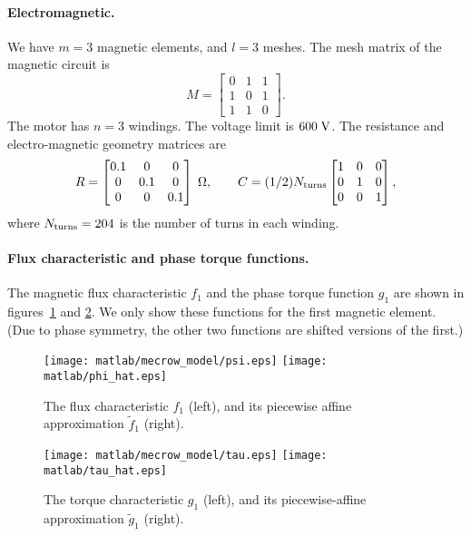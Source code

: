 \documentclass[11pt]{article}
\newif\ifarxiv
\begin{document}
\paragraph{Electromagnetic.}
We have $m = 3$ magnetic elements, and $l = 3$ meshes.
The mesh matrix of the magnetic circuit is
\[
M = 
\begin{bmatrix}
   0 &  1 &  1 \\
   1 &  0 &  1 \\
   1 &  1 &  0
\end{bmatrix}.
\]
The motor has $n = 3$ windings.
The voltage limit is $600 \; \rm V$.
The resistance and electro-magnetic geometry matrices are
\[
R = 
\begin{bmatrix}
  0.1 &   0 &   0 \\
    0 & 0.1 &   0 \\
    0 &   0 & 0.1
\end{bmatrix} \; \Omega,
\qquad
C = (1/2)N_{\rm turns}
\begin{bmatrix}
  1 & 0 & 0 \\
  0 & 1 & 0 \\
  0 & 0 & 1
\end{bmatrix},
\]
where $N_{\rm turns} = 204$ is the number of turns in each winding.






\paragraph{Flux characteristic and phase torque functions.}
The magnetic flux characteristic $f_1$ and the phase torque function $g_1$ 
are shown in figures~\ref{f-flux-characteristic}
and \ref{f-torque-function}.
We only show these functions for the first magnetic element.
(Due to phase symmetry,
the other two functions are shifted versions of the first.)

\begin{figure} 
\begin{center}
\ifarxiv
\texttt{[image: psi.eps]}
\texttt{[image: phi\_hat.eps]}
\else
\texttt{[image: matlab/mecrow\_model/psi.eps]}
\texttt{[image: matlab/phi\_hat.eps]}
\fi
\caption{
The flux characteristic $f_1$ (left),
and its piecewise affine approximation $\tilde f_1$ (right).
}
\label{f-flux-characteristic}
\end{center}
\end{figure}

\begin{figure} 
\begin{center}
\ifarxiv
\texttt{[image: tau.eps]}
\texttt{[image: tau\_hat.eps]}
\else
\texttt{[image: matlab/mecrow\_model/tau.eps]}
\texttt{[image: matlab/tau\_hat.eps]}
\fi
\caption{
The torque characteristic $g_1$ (left),
and its piecewise-affine approximation $\tilde g_1$ (right).
}
\label{f-torque-function}
\end{center}
\end{figure}
\end{document}
